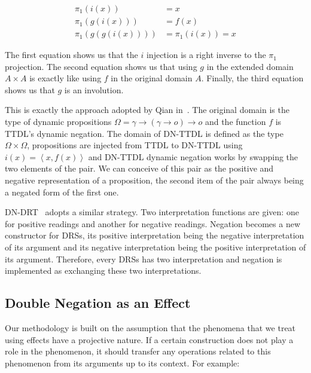 \begin{align*}
\pi_1(i(x)) &= x \\
\pi_1(g(i(x))) &= f(x) \\
\pi_1(g(g(i(x)))) &= \pi_1(i(x)) = x
\end{align*}

The first equation shows us that the $i$ injection is a right inverse to
the $\pi_1$ projection. The second equation shows us that using $g$ in the
extended domain $A \times A$ is exactly like using $f$ in the original
domain $A$. Finally, the third equation shows us that $g$ is an involution.

This is exactly the approach adopted by Qian
in~\cite{qian2014accessibility}. The original domain is the type of dynamic
propositions $\Omega = \gamma \to (\gamma \to o) \to o$ and the function
$f$ is TTDL's dynamic negation. The domain of DN-TTDL is defined as the
type $\Omega \times \Omega$, propositions are injected from TTDL to DN-TTDL
using $i(x) = \left<x, f(x)\right>$ and DN-TTDL dynamic negation works by
swapping the two elements of the pair. We can conceive of this pair as the
positive and negative representation of a proposition, the second item of
the pair always being a negated form of the first one.

DN-DRT~\cite{krahmer1995negation} adopts a similar strategy. Two
interpretation functions are given: one for positive readings and another
for negative readings. Negation becomes a new constructor for DRSs, its
positive interpretation being the negative interpretation of its argument
and its negative interpretation being the positive interpretation of its
argument. Therefore, every DRSs has two interpretation and negation is
implemented as exchanging these two interpretations.


\subsection{Double Negation as an Effect}

Our methodology is built on the assumption that the phenomena that we treat
using effects have a projective nature. If a certain construction does not
play a role in the phenomenon, it should transfer any operations related to
this phenomenon from its arguments up to its context. For example:

